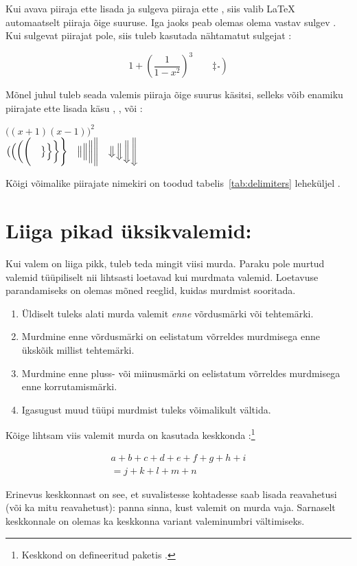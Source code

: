 Kui avava piiraja ette lisada  ja sulgeva piiraja ette
, siis valib \LaTeX{} automaatselt piiraja õige suuruse. Iga
 jaoks peab olemas olema vastav sulgev . Kui sulgevat
piirajat pole, siis tuleb kasutada nähtamatut sulgejat :
\begin{example}
\begin{equation*}
1 + \left(\frac{1}{1-x^{2}}
    \right)^3 \qquad
\left. \ddagger \frac{~}{~}\right)
\end{equation*}
\end{example}

Mõnel juhul tuleb seada valemis piiraja õige suurus käsitsi, selleks
võib enamiku piirajate ette lisada käsu , , 
või :
\begin{example}
$\Big((x+1)(x-1)\Big)^{2}$\\
$\big( \Big( \bigg( \Bigg( \quad
\big\} \Big\} \bigg\} \Bigg\} \quad
\big\| \Big\| \bigg\| \Bigg\| \quad
\big\Downarrow \Big\Downarrow
\bigg\Downarrow \Bigg\Downarrow$
\end{example}
Kõigi võimalike piirajate nimekiri on toodud tabelis~\ref{tab:delimiters}
leheküljel \pageref{tab:delimiters}.

\section{Liiga pikad üksikvalemid: }
\label{sec:multline}

Kui valem on liiga pikk, tuleb teda mingit viisi murda. Paraku pole
murtud valemid tüüpiliselt nii lihtsasti loetavad kui murdmata valemid.
Loetavuse parandamiseks on olemas mõned reeglid, kuidas murdmist
sooritada.
\begin{enumerate}
\item Üldiselt tuleks alati murda valemit \emph{enne} võrdusmärki või
  tehtemärki.
\item Murdmine enne võrdusmärki on eelistatum võrreldes murdmisega enne
  ükskõik millist tehtemärki.
\item Murdmine enne pluss- või miinusmärki on eelistatum võrreldes
  murdmisega enne korrutamismärki.
\item Igasugust muud tüüpi murdmist tuleks võimalikult vältida.
\end{enumerate}
Kõige lihtsam viis valemit murda on kasutada keskkonda
:\footnote{Keskkond  on defineeritud
paketis .}
\begin{example}
\begin{multline}
  a + b + c + d + e + f
  + g + h + i \\
  = j + k + l + m + n
\end{multline}
\end{example}
\noindent
Erinevus keskkonnast  on see, et suvalistesse kohtadesse
saab lisada reavahetusi (või ka mitu reavahetust): panna \ci{\bs}
sinna, kust valemit on murda vaja. Sarnaselt keskkonnale 
on olemas ka keskkonna variant  valeminumbri
vältimiseks.

